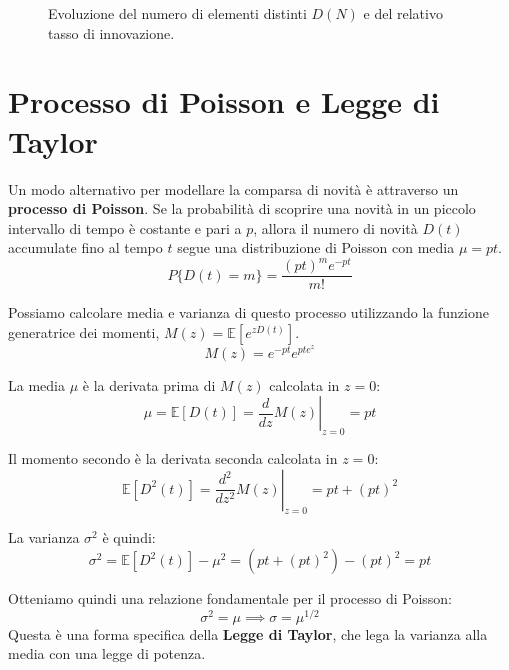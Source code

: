 \begin{figure}[h!]
\begin{minipage}{0.48\textwidth}
    \end{minipage}

    \vspace{1em}
    \caption{Evoluzione del numero di elementi distinti $D(N)$ e del relativo tasso di innovazione.}
    \label{fig:confronto_corretto}
\end{figure}


\section{Processo di Poisson e Legge di Taylor}

Un modo alternativo per modellare la comparsa di novità è attraverso un \textbf{processo di Poisson}. Se la probabilità di scoprire una novità in un piccolo intervallo di tempo è costante e pari a $p$, allora il numero di novità $D(t)$ accumulate fino al tempo $t$ segue una distribuzione di Poisson con media $\mu = pt$.
$$P\{D(t)=m\} = \frac{(pt)^m e^{-pt}}{m!}$$

Possiamo calcolare media e varianza di questo processo utilizzando la funzione generatrice dei momenti, $M(z) = \mathbb{E}[e^{zD(t)}]$.
$$M(z) = e^{-pt} e^{pte^z}$$

La media $\mu$ è la derivata prima di $M(z)$ calcolata in $z=0$:
$$\mu = \mathbb{E}[D(t)] = \left. \frac{d}{dz} M(z) \right|_{z=0} = pt$$

Il momento secondo è la derivata seconda calcolata in $z=0$:
$$\mathbb{E}[D^2(t)] = \left. \frac{d^2}{dz^2} M(z) \right|_{z=0} = pt + (pt)^2$$

La varianza $\sigma^2$ è quindi:
$$\sigma^2 = \mathbb{E}[D^2(t)] - \mu^2 = (pt + (pt)^2) - (pt)^2 = pt$$

Otteniamo quindi una relazione fondamentale per il processo di Poisson:
$$\sigma^2 = \mu \implies \sigma = \mu^{1/2}$$
Questa è una forma specifica della \textbf{Legge di Taylor}, che lega la varianza alla media con una legge di potenza.


